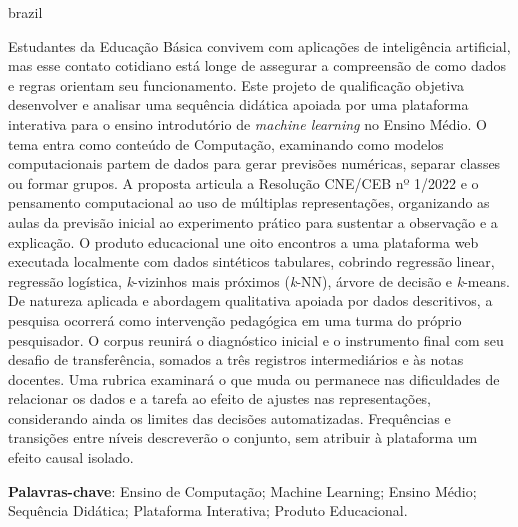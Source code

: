 \setlength{\absparsep}{18pt} 

\begin{resumo}[Resumo]
 \begin{otherlanguage*}{brazil}
   
   \vspace{\onelineskip}
   \noindent 
   
Estudantes da Educação Básica convivem com aplicações de inteligência artificial, mas esse contato cotidiano está longe de assegurar a compreensão de como dados e regras orientam seu funcionamento. Este projeto de qualificação objetiva desenvolver e analisar uma sequência didática apoiada por uma plataforma interativa para o ensino introdutório de \textit{machine learning} no Ensino Médio. O tema entra como conteúdo de Computação, examinando como modelos computacionais partem de dados para gerar previsões numéricas, separar classes ou formar grupos. A proposta articula a Resolução CNE/CEB nº 1/2022 e o pensamento computacional ao uso de múltiplas representações, organizando as aulas da previsão inicial ao experimento prático para sustentar a observação e a explicação. O produto educacional une oito encontros a uma plataforma web executada localmente com dados sintéticos tabulares, cobrindo regressão linear, regressão logística, \textit{k}-vizinhos mais próximos (\textit{k}-NN), árvore de decisão e \textit{k}-means. De natureza aplicada e abordagem qualitativa apoiada por dados descritivos, a pesquisa ocorrerá como intervenção pedagógica em uma turma do próprio pesquisador. O corpus reunirá o diagnóstico inicial e o instrumento final com seu desafio de transferência, somados a três registros intermediários e às notas docentes. Uma rubrica examinará o que muda ou permanece nas dificuldades de relacionar os dados e a tarefa ao efeito de ajustes nas representações, considerando ainda os limites das decisões automatizadas. Frequências e transições entre níveis descreverão o conjunto, sem atribuir à plataforma um efeito causal isolado.
   
   \textbf{Palavras-chave}: Ensino de Computação; Machine Learning; Ensino Médio; Sequência Didática; Plataforma Interativa; Produto Educacional.

 \end{otherlanguage*}
\end{resumo}

